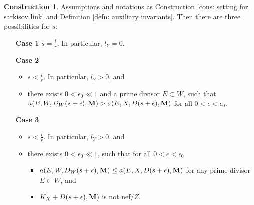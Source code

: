 \documentclass[11pt]{amsart}
\numberwithin{equation}{section}
\newcommand{\Mm}{{\bf{M}}}
\theoremstyle{definition}
\theoremstyle{definition}
\newtheorem{cons}[thm]{Construction}
\theoremstyle{definition}
\begin{document}
\begin{cons}\label{cons: cases of sarkisov link with scaling}
Assumptions and notations as Construction \ref{cons: setting for sarkisov link} and Definition \ref{defn: auxiliary invariants}. Then there are three possibilities for $s$:
\begin{itemize}
   \item[\textbf{Case 1}] $s=\frac{l}{r}$. In particular, $l_Y=0.$
    \item[\textbf{Case 2}] 
    \begin{itemize}
        \item $s<\frac{l}{r}$. In particular, $l_Y>0$, and 
        \item there exists $0<\epsilon_{0}\ll 1$ and a prime divisor $E\subset W$, such that $a(E,W,D_W(s+\epsilon),\Mm)>a(E,X,D(s+\epsilon),\Mm)$ for all $0<\epsilon<\epsilon_{0}$.
    \end{itemize}
        \item[\textbf{Case 3}] 
    \begin{itemize}
        \item $s<\frac{l}{r}$. In particular, $l_Y>0$, and 
        \item there exists $0<\epsilon_{0}\ll 1$, such that for all $0<\epsilon<\epsilon_{0}$ 
        \begin{itemize}
            \item $a(E,W,D_W(s+\epsilon),\Mm)\leq a(E,X,D(s+\epsilon),\Mm)$ for any prime divisor $E\subset W$, and
            \item $K_X+D(s+\epsilon),\Mm)$ is not nef$/Z$.
        \end{itemize} 
    \end{itemize}
\end{itemize}
\end{cons}
\end{document}
